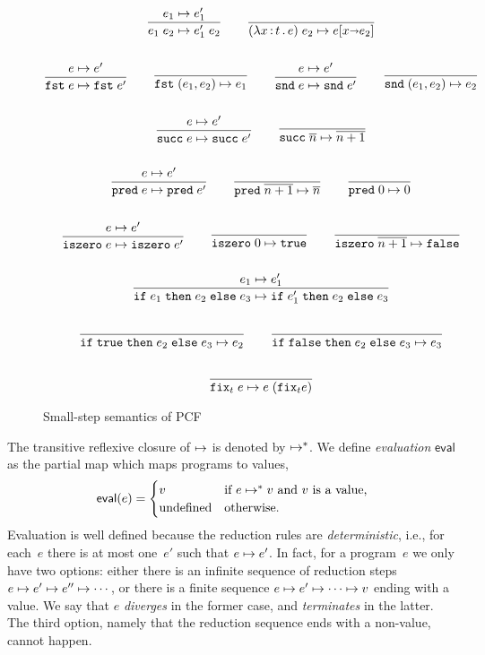 \begin{figure}[htpb]
  \centering
\begin{gather*}
  \begin{gathered}\dfrac{e_1 \mapsto e_1'}{e_1 \; e_2 \mapsto e_1'\; e_2}\end{gathered}
  \qquad
  \dfrac{}{(\lambda x \,{:}\, t\,.\,e)\;e_2 \mapsto e[x {\shortrightarrow} e_2]}
  \\ \\
  \begin{gathered}\dfrac{e \mapsto e'}{\mathtt{fst}\;e \mapsto \mathtt{fst}\;e'}\end{gathered}
  \qquad
  \dfrac{}{\mathtt{fst}\;(e_1, e_2) \mapsto e_1}
  \qquad
  \begin{gathered}\dfrac{e \mapsto e'}{\mathtt{snd}\;e \mapsto \mathtt{snd}\;e'}\end{gathered}
  \qquad
  \dfrac{}{\mathtt{snd}\;(e_1, e_2) \mapsto e_2}
  \\ \\
  \begin{gathered}\dfrac{e \mapsto e'}{\mathtt{succ}\;e \mapsto \mathtt{succ}\;e'}\end{gathered}
  \qquad
  \dfrac{}{\mathtt{succ}\;\overline{n} \mapsto \overline{n+1}}
  \\ \\
  \begin{gathered}\dfrac{e \mapsto e'}{\mathtt{pred}\;e \mapsto \mathtt{pred}\;e'}\end{gathered}
  \qquad
  \dfrac{}{\mathtt{pred}\;\overline{n+1} \mapsto \overline{n}}
  \qquad
  \dfrac{}{\mathtt{pred}\;0 \mapsto 0}
  \\ \\
  \begin{gathered}\dfrac{e \mapsto e'}{\mathtt{iszero}\;e \mapsto \mathtt{iszero}\;e'}\end{gathered}
  \qquad
  \dfrac{}{\mathtt{iszero}\;0 \mapsto \mathtt{true}}
  \qquad
  \dfrac{}{\mathtt{iszero}\;\overline{n+1} \mapsto \mathtt{false}}
  \\ \\
  \begin{gathered}\dfrac{e_1 \mapsto e_1'}{\mathtt{if}\;e_1\;\mathtt{then}\;e_2\;\mathtt{else}\;e_3 \mapsto \mathtt{if}\;e_1'\;\mathtt{then}\;e_2\;\mathtt{else}\;e_3}\end{gathered}
  \\ \\
  \dfrac{}{\mathtt{if}\;\mathtt{true}\;\mathtt{then}\;e_2\;\mathtt{else}\;e_3 \mapsto e_2}
  \qquad
  \dfrac{}{\mathtt{if}\;\mathtt{false}\;\mathtt{then}\;e_2\;\mathtt{else}\;e_3 \mapsto e_3}
  \\ \\
  \dfrac{}{\mathtt{fix}_t\;e \mapsto e\;(\mathtt{fix}_t e)}
\end{gather*}
  \caption{Small-step semantics of PCF}
  \label{fig:pcf}
\end{figure}

The transitive reflexive closure of $\mapsto$ is denoted by $\mapsto^{*}$.
We define \emph{evaluation} $\mathsf{eval}$ as the partial map which
maps programs to values,
%
\begin{equation*}
  \mathsf{eval}(e) =
  \begin{cases}
    v & \text{if $e \mapsto^{*} v$ and $v$ is a value,}\\
    \text{undefined} & \text{otherwise.}
  \end{cases}
\end{equation*}
%
Evaluation is well defined because the reduction rules are
\emph{deterministic}, i.e., for each~$e$ there is at most one~$e'$
such that $e \mapsto e'$. In fact, for a program~$e$ we only have two
options: either there is an infinite sequence of reduction steps $e
\mapsto e' \mapsto e'' \mapsto \cdots$, or there is a finite sequence $e
\mapsto e' \mapsto \cdots \mapsto v$ ending with a value. We say that $e$
\emph{diverges} in the former case, and \emph{terminates} in the
latter. The third option, namely that the reduction sequence ends with
a non-value, cannot happen.

